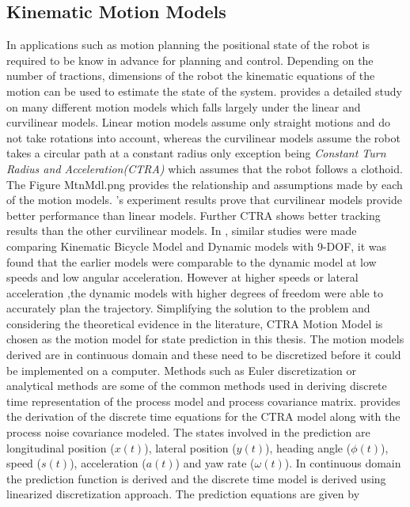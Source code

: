 \subsection{Kinematic Motion Models}
In applications such as motion planning the positional state of the robot is required to be know in advance for planning and control. Depending on the number of tractions, dimensions of the robot the kinematic equations of the motion can be used to estimate the state of the system. \cite{R.Schubert} provides a detailed study on many different motion models which falls largely under the linear and curvilinear models. Linear motion models assume only straight motions and do not take rotations into account, whereas the curvilinear models assume the robot takes a circular path at a constant radius only exception being \textit{Constant Turn  Radius and Acceleration(CTRA)} which assumes that the robot follows a clothoid. The Figure \figurename{MtnMdl.png} provides the relationship and assumptions made by each of the motion models. \cite{R.Schubert}'s experiment results prove that curvilinear models provide better performance than linear models. Further CTRA shows better tracking results than the other curvilinear models. In \cite{Polack}, similar studies were made comparing Kinematic Bicycle Model and Dynamic models with 9-DOF, it was found that the earlier models were comparable to the dynamic model at low speeds and low angular acceleration. However at higher speeds or lateral
acceleration ,the dynamic models with higher degrees of freedom were able to accurately plan the trajectory. Simplifying the solution to the problem and considering the theoretical  evidence in the literature, CTRA Motion Model is chosen as the motion model for state prediction in this thesis. The motion models derived are in continuous domain and these need to be discretized before it could be implemented on a computer. Methods such as Euler discretization or analytical methods are some of the common methods used in deriving discrete time representation of the process model and process covariance matrix. \cite{D.Svensson} provides the derivation of the discrete time equations for the CTRA model along with the process noise covariance modeled. The states involved in the prediction are longitudinal position ($x(t)$), lateral position ($y(t)$), heading angle ($\phi(t)$), speed ($s(t)$), acceleration ($a(t)$) and yaw rate ($\omega(t)$). In continuous domain the prediction function is derived and the discrete time model is derived using linearized discretization approach. The prediction equations are given by 
